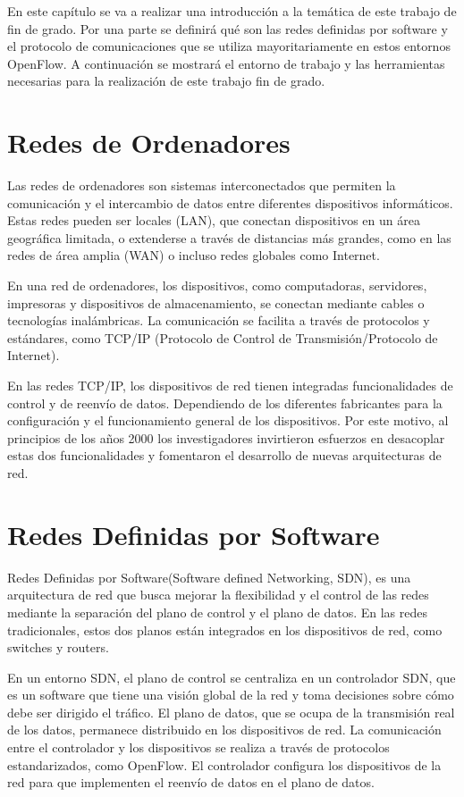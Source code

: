 \documentclass[a4paper, 12pt]{book}
\begin{document}
	
	En este capítulo se va a realizar una introducción a la temática de este trabajo de fin de grado. Por una
	parte se definirá qué son las redes definidas por software y el protocolo de comunicaciones que
	se utiliza mayoritariamente en estos entornos OpenFlow. A continuación se mostrará el entorno
	de trabajo y las herramientas necesarias para la realización de este trabajo fin de grado.
	
	
	\section{Redes de Ordenadores} 
	\label{sec:redes}
	
	Las redes de ordenadores son sistemas interconectados que permiten la comunicación y el intercambio de datos entre diferentes dispositivos informáticos. Estas redes pueden ser locales (LAN), que conectan dispositivos en un área geográfica limitada, o extenderse a través de distancias más grandes, como en las redes de área amplia (WAN) o incluso redes globales como Internet.
	
	En una red de ordenadores, los dispositivos, como computadoras, servidores, impresoras y dispositivos de almacenamiento, se conectan mediante cables o tecnologías inalámbricas. La comunicación se facilita a través de protocolos y estándares, como TCP/IP (Protocolo de Control de Transmisión/Protocolo de Internet).
	
	En las redes TCP/IP, los dispositivos de red tienen integradas funcionalidades de
	control y de reenvío de datos. Dependiendo de los diferentes fabricantes para la configuración
	y el funcionamiento general de los dispositivos. Por este motivo, al principios de los años
	2000 los investigadores invirtieron esfuerzos en desacoplar estas dos funcionalidades y fomentaron
	el desarrollo de nuevas arquitecturas de red.
	
	\section{Redes Definidas por Software} 
	\label{sec:sdn}
	
	Redes Definidas por Software(Software defined Networking, SDN), es una arquitectura de red que busca mejorar la flexibilidad y el control de las redes mediante la separación del plano de control y el plano de datos. En las redes tradicionales, estos dos planos están integrados en los dispositivos de red, como switches y routers.
	
	En un entorno SDN, el plano de control se centraliza en un controlador SDN, que es un software que tiene una visión global de la red y toma decisiones sobre cómo debe ser dirigido el tráfico. El plano de datos, que se ocupa de la transmisión real de los datos, permanece distribuido en los dispositivos de red. La comunicación entre el controlador y los dispositivos se realiza a través de protocolos estandarizados, como OpenFlow. El controlador configura los dispositivos de la red para que implementen el reenvío de datos en el plano de datos.
	
\end{document}
